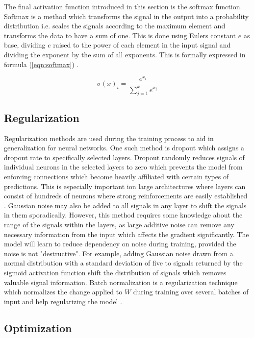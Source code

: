 The final activation function introduced in this section is the softmax function. Softmax is a method which transforms the signal in the output into a probability distribution i.e. scales the signals according to the maximum element and transforms the data to have a sum of one. This is done using Eulers constant $e$ as base, dividing $e$ raised to the power of each element in the input signal and dividing the exponent by the sum of all exponents. This is formally expressed in formula (\ref{eqn:softmax}) \cite{misra2019mish}.

\begin{equation}
\label{eqn:softmax}
\sigma(x)_i = \frac{e^{x_i}}{\sum_{j=1}^k e^{x_j}}
\end{equation}

\subsection{Regularization}
Regularization methods are used during the training process to aid in generalization for neural networks. One such method is dropout which assigns a dropout rate to specifically selected layers. Dropout randomly reduces signals of individual neurons in the selected layers to zero which prevents the model from enforcing connections which become heavily affiliated with certain types of predictions. This is especially important ion large architectures where layers can consist of hundreds of neurons where strong reinforcements are easily established \cite{srivastava2013improving}. Gaussian noise may also be added to all signals in any layer to shift the signals in them sporadically. However, this method requires some knowledge about the range of the signals within the layers, as large additive noise can remove any necessary information from the input which affects the gradient significantly. The model will learn to reduce dependency on noise during training, provided the noise is not "destructive". For example, adding Gaussian noise drawn from a normal distribution with a standard deviation of five to signals returned by the sigmoid activation function shift the distribution of signals which removes valuable signal information. Batch normalization is a regularization technique which normalizes the change applied to $W$ during training over several batches of input and help regularizing the model \cite{santurkar2018does}.

\subsection{Optimization}

